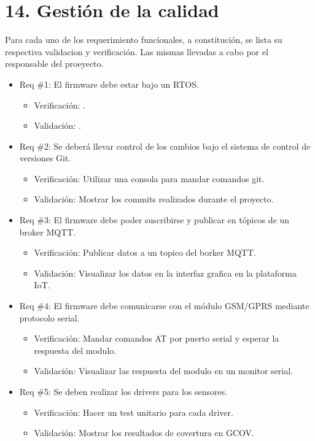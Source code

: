 \documentclass[
11pt, %
codirector, %
]{charter}
\begin{document}
\section{14. Gestión de la calidad}
\label{sec:calidad}
Para cada uno de los requerimiento funcionales, a constitución, se lista su respectiva validacion y verificación. Las mismas llevadas a cabo por el responsable del proeyecto.

\begin{itemize} 
	\item Req \#1: El firmware debe estar bajo un RTOS.
	\begin{itemize}
		\item Verificación: .
		\item Validación: . 
	\end{itemize}

	\item Req \#2: Se deberá llevar control de los cambios bajo el sistema de control de versiones Git.
	\begin{itemize}
		\item Verificación: Utilizar una consola para mandar comandos git.
		\item Validación: Mostrar los commits realizados durante el proyecto.  
	\end{itemize}

	\item Req \#3: El firmware debe poder suscribirse y publicar en tópicos de un broker MQTT.
	\begin{itemize}
		\item Verificación: Publicar datos a un topico del borker MQTT.
		\item Validación: Visualizar los datos en la interfaz grafica en la plataforma IoT. 
	\end{itemize}

	\item Req \#4: El firmware debe comunicarse con el módulo GSM/GPRS mediante protocolo serial.
	\begin{itemize}
		\item Verificación: Mandar comandos AT por puerto serial y esperar la respuesta del modulo.
		\item Validación: Visualizar las respuesta del  modulo en un monitor serial. 
	\end{itemize}

	\item Req \#5: Se deben realizar los drivers para los sensores.
	\begin{itemize}
		\item Verificación: Hacer un test unitario para cada driver.
		\item Validación: Mostrar los resultados de covertura en GCOV. 
	\end{itemize}


\end{itemize}
\end{document}
